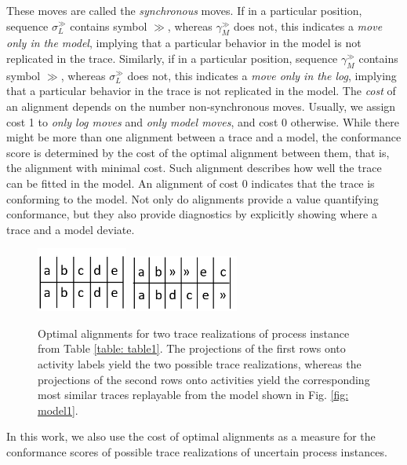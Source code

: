 These moves are called the \textit{synchronous} moves.
If in a particular position, sequence $\sigma_L^{\gg}$ contains symbol $\gg$, whereas $\gamma_M^{\gg}$ does not, this indicates a \textit{move only in the model}, implying that a particular behavior in the model is not replicated in the trace.
Similarly, if in a particular position, sequence $\gamma_M^{\gg}$ contains symbol $\gg$, whereas $\sigma_L^{\gg}$ does not, this indicates a \textit{move only in the log}, implying that a particular behavior in the trace is not replicated in the model.
The \textit{cost} of an alignment depends on the number non-synchronous moves.
Usually, we assign cost 1 to \textit{only log moves} and \textit{only model moves}, and cost 0 otherwise.
While there might be more than one alignment between a trace and a model, the conformance score is determined by the cost of the optimal alignment between them, that is, the alignment with minimal cost.
Such alignment describes how well the trace can be fitted in the model.
An alignment of cost 0 indicates that the trace is conforming to the model.
Not only do alignments provide a value quantifying conformance, but they also provide diagnostics by explicitly showing where a trace and a model deviate.
%
%
\begin{figure}[t]
  \centering
 {\includegraphics[width=30mm]{figures/align1.png}\label{align1}
 	}
  {\label{align2}\includegraphics[width=36mm]{figures/align2.png}
	}
	\label{fig: two alignments}
	\caption{Optimal alignments for two trace realizations of process instance from Table \ref{table: table1}.
	The projections of the first rows onto activity labels yield the two possible trace realizations, whereas the projections of the second rows onto activities yield the corresponding most similar traces replayable from the model shown in Fig. \ref{fig: model1}.}
\end{figure}
%

In this work, we also use the cost of optimal alignments as a measure for the conformance scores of possible trace realizations of uncertain process instances.
%
%
%
%
%
%
%